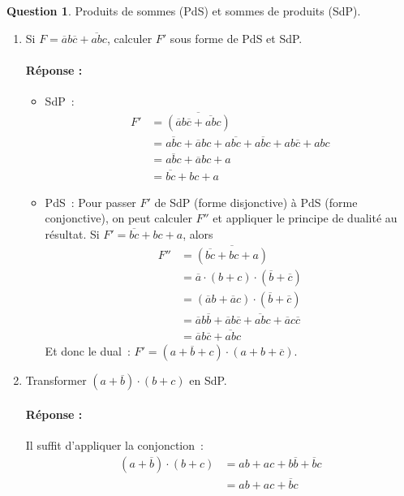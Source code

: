 \documentclass[11pt,a4paper]{article}
\theoremstyle{definition}%
\newtheorem{Q}{Question}[] %
\newcommand{\reponse}[1]{%
	\ifthenelse {\boolean{corrige}} {\paragraph{Réponse :} \color{darkblue}   #1\color{black}} {}
 }
\begin{document}
\begin{Q}
Produits de sommes (PdS) et sommes de produits (SdP).

\begin{enumerate}
	\item Si $F = \overline{a}b\overline{c} + \overline{ab}c$, calculer $F'$ sous forme de PdS et SdP.
	\reponse{
		\begin{itemize}
			\item SdP~:
				\begin{align*}
				F' & = \overline{( \overline{a}b\overline{c} + \overline{ab}c )} \\
				& = \overline{abc} + \overline{a}bc + a\overline{bc} + a\overline{b}c + ab\overline{c} + abc \\
				& = \overline{abc} + \overline{a}bc + a \\
				& = \overline{bc} + bc + a
				\end{align*}
			\item PdS~: Pour passer $F'$ de SdP (forme disjonctive) à PdS (forme conjonctive), on peut calculer $F''$ et appliquer le principe de dualité au résultat.
			Si $F' = \overline{bc} + bc + a$, alors
				\begin{align*}
				F'' & = \overline{( \overline{bc} + bc + a )} \\
				& = \overline{a} \cdot (b+c) \cdot (\overline{b} + \overline{c}) \\
				& = (\overline{a}b + \overline{a}c) \cdot (\overline{b} + \overline{c}) \\
				& = \overline{a}b\overline{b} + \overline{a}b\overline{c} + \overline{ab}c + \overline{a}c\overline{c} \\
				& = \overline{a}b\overline{c} + \overline{ab}c
				\end{align*}
			Et donc le dual~: $F' = (a + \overline{b} + c) \cdot (a + b + \overline{c})$.
		\end{itemize}
	}

	\item Transformer $(a+\overline{b}) \cdot (b+c)$ en SdP.
	\reponse{
		Il suffit d'appliquer la conjonction~:
		\begin{align*}
		(a+\overline{b}) \cdot (b+c) & = ab + ac + b\overline{b} + \overline{b}c \\
		& = ab + ac + \overline{b}c
		\end{align*}
	}


\end{enumerate}
\end{Q}
\end{document}
